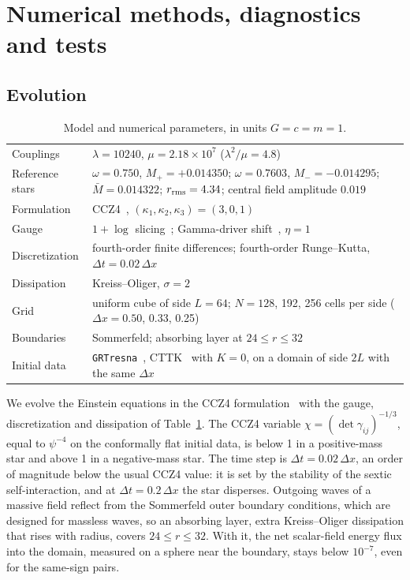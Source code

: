 \documentclass[twocolumn,floatfix,aps,prd,superscriptaddress,nofootinbib]{revtex4-2}
\begin{document}
\section{Numerical methods, diagnostics and tests}
\label{sec:setup}

\subsection{Evolution}

\begin{table}[t]
\caption{Model and numerical parameters, in units $G=c=m=1$.}
\label{tab:params}
\begin{ruledtabular}
\begin{tabular}{lp{}}
Couplings & $\lambda=10240$, $\mu=2.18\times10^{7}$ ($\lambda^2/\mu=4.8$) \\
Reference stars & $\omega=0.750$, $M_+=+0.014350$; $\omega=0.7603$, $M_-=-0.014295$; $\bar M=0.014322$; $r_{\rm rms}=4.34$; central field amplitude $0.019$ \\
Formulation & CCZ4~\cite{alic2012}, $(\kappa_1,\kappa_2,\kappa_3)=(3,0,1)$ \\
Gauge & $1{+}\log$ slicing~\cite{bona1995}; Gamma-driver shift~\cite{campanelli2006,baker2006}, $\eta=1$ \\
Discretization & fourth-order finite differences; fourth-order Runge--Kutta, $\Delta t=0.02\,\Delta x$ \\
Dissipation & Kreiss--Oliger, $\sigma=2$ \\
Grid & uniform cube of side $L=64$; $N=128$, 192, 256 cells per side ($\Delta x=0.50$, 0.33, 0.25) \\
Boundaries & Sommerfeld; absorbing layer at $24\le r\le32$ \\
Initial data & \texttt{GRTresna}~\cite{grtresna}, CTTK~\cite{cttk} with $K=0$, on a domain of side $2L$ with the same $\Delta x$ \\
\end{tabular}
\end{ruledtabular}
\end{table}

We evolve the Einstein equations in the CCZ4 formulation~\cite{alic2012} with the gauge, discretization and dissipation of Table~\ref{tab:params}. The CCZ4 variable $\chi=(\det\gamma_{ij})^{-1/3}$, equal to $\psi^{-4}$ on the conformally flat initial data, is below 1 in a positive-mass star and above 1 in a negative-mass star. The time step is $\Delta t=0.02\,\Delta x$, an order of magnitude below the usual CCZ4 value: it is set by the stability of the sextic self-interaction, and at $\Delta t=0.2\,\Delta x$ the star disperses. Outgoing waves of a massive field reflect from the Sommerfeld outer boundary conditions, which are designed for massless waves, so an absorbing layer, extra Kreiss--Oliger dissipation that rises with radius, covers $24\le r\le32$. With it, the net scalar-field energy flux into the domain, measured on a sphere near the boundary, stays below $10^{-7}$, even for the same-sign pairs.
\end{document}
